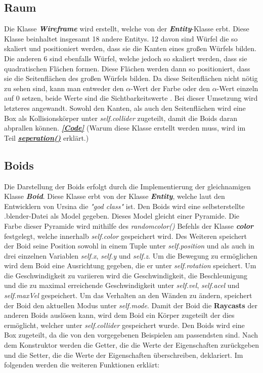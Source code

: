 \documentclass[a4paper, hidelinks, 12pt]{article}
\begin{document}
\subsection{Raum}\label{UmsetzungWireframe}
Die Klasse \textbf{\emph{Wireframe}} wird erstellt, welche von der \textbf{\emph{Entity}}-Klasse\cite{2022l} erbt. Diese Klasse beinhaltet insgesamt 18 andere Entitys. 12 davon sind Würfel die so skaliert und positioniert werden, dass sie die Kanten eines großen Würfels bilden. Die anderen 6 sind ebenfalls Würfel, welche jedoch so skaliert werden, dass sie quadratischen Flächen formen. Diese Flächen werden dann so positioniert, dass sie die Seitenflächen des großen Würfels bilden. Da diese Seitenflächen nicht nötig zu sehen sind, kann man entweder den $\alpha$-Wert der Farbe oder den $\alpha$-Wert einzeln auf 0 setzen, beide Werte sind die Sichtbarkeitswerte \cite{2022p}. Bei dieser Umsetzung wird letzteres angewandt. Sowohl den Kanten, als auch den Seitenflächen wird eine Box als Kollisionskörper unter \emph{self.collider} zugeteilt, damit die Boids daran abprallen können\cite{2022r}. \hyperref[CodeRaum]{\textbf{\emph{[Code]}}} \newline\newline \scriptsize (Warum diese Klasse erstellt werden muss, wird im Teil \hyperref[Umsetzungseperation]{\textbf{\emph{seperation()}}} erklärt.)
\newpage
\normalsize\subsection{Boids}\label{UmsetzungBoid}
Die Darstellung der Boids erfolgt durch die Implementierung der gleichnamigen Klasse \textbf{\emph{Boid}}. Diese Klasse erbt von der Klasse \textbf{\emph{Entity}}\cite{2022l}, welche laut den Entwicklern von Ursina die \emph{"god class"} ist\cite{godclass}. 
Den Boids wird eine selbsterstellte .blender-Datei als Model gegeben. Dieses Model gleicht einer Pyramide. Die Farbe dieser Pyramide wird mithilfe des \emph{random\textunderscore color()} Befehls der Klasse \textbf{\emph{color}} festgelegt, welche innerhalb \emph{self.color} gespeichert wird\cite{color}. Des Weiteren speichert der Boid seine Position sowohl in einem Tuple unter \emph{self.position} und als auch in drei einzelnen Variablen \emph{self.x}, \emph{self.y} und \emph{self.z}. Um die Bewegung zu ermöglichen wird dem Boid eine Ausrichtung gegeben, die er unter \emph{self.rotation} speichert\cite{2022l}. Um die Geschwindigkeit zu variieren wird die Geschwindigkeit, die Beschleunigung und die zu maximal erreichende Geschwindigkeit unter \emph{self.vel}, \emph{self.acel} und \emph{self.maxVel} gespeichert. Um das Verhalten an den Wänden zu ändern, speichert der Boid den aktuellen Modus unter \emph{self.mode}. Damit der Boid die \textbf{Raycasts}\cite{raycast} der anderen Boids auslösen kann, wird dem Boid ein Körper zugeteilt der dies ermöglicht, welcher unter \emph{self.collider} gespeichert wurde. Den Boids wird eine Box zugeteilt, da die von den vorgegebenen Beispielen am passendsten sind\cite{2022r}.
Nach dem Konstruktor werden die Getter, die die Werte der Eigenschaften zurückgeben und die Setter, die die Werte der Eigenschaften überschreiben, deklariert.
Im folgenden werden die weiteren Funktionen erklärt:\newline
	
\end{document}

